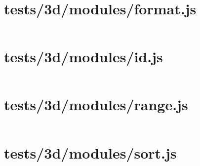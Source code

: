 \documentclass[a4paper]{article}
\begin{document}
\section{tests/3d/modules/format.js}
\inputminted[linenos,breaklines,breakbytoken]{javascript}{tests/3d/modules/format.js}

\section{tests/3d/modules/id.js}
\inputminted[linenos,breaklines,breakbytoken]{javascript}{tests/3d/modules/id.js}

\section{tests/3d/modules/range.js}
\inputminted[linenos,breaklines,breakbytoken]{javascript}{tests/3d/modules/range.js}

\section{tests/3d/modules/sort.js}
\inputminted[linenos,breaklines,breakbytoken]{javascript}{tests/3d/modules/sort.js}
\end{document}
